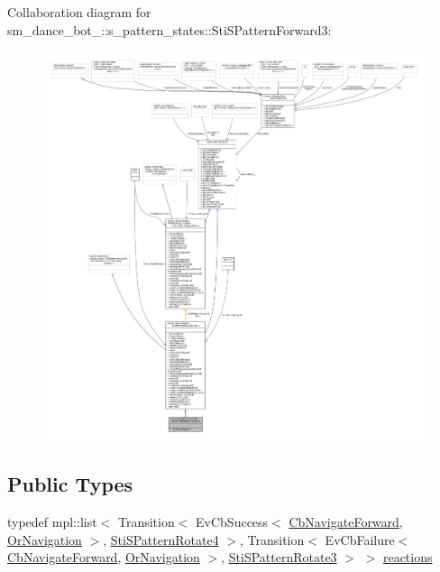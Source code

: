Collaboration diagram for sm\+\_\+dance\+\_\+bot\+\_\+:\+:s\+\_\+pattern\+\_\+states\+:\+:Sti\+S\+Pattern\+Forward3\+:
\nopagebreak
\begin{figure}[H]
\begin{center}
\leavevmode
\includegraphics[width=350pt]{structsm__dance__bot__2_1_1s__pattern__states_1_1StiSPatternForward3__coll__graph}
\end{center}
\end{figure}
\subsection*{Public Types}
\begin{DoxyCompactItemize}
\item 
typedef mpl\+::list$<$ Transition$<$ Ev\+Cb\+Success$<$ \hyperlink{classcl__move__base__z_1_1CbNavigateForward}{Cb\+Navigate\+Forward}, \hyperlink{classsm__dance__bot__2_1_1OrNavigation}{Or\+Navigation} $>$, \hyperlink{structsm__dance__bot__2_1_1s__pattern__states_1_1StiSPatternRotate4}{Sti\+S\+Pattern\+Rotate4} $>$, Transition$<$ Ev\+Cb\+Failure$<$ \hyperlink{classcl__move__base__z_1_1CbNavigateForward}{Cb\+Navigate\+Forward}, \hyperlink{classsm__dance__bot__2_1_1OrNavigation}{Or\+Navigation} $>$, \hyperlink{structsm__dance__bot__2_1_1s__pattern__states_1_1StiSPatternRotate3}{Sti\+S\+Pattern\+Rotate3} $>$ $>$ \hyperlink{structsm__dance__bot__2_1_1s__pattern__states_1_1StiSPatternForward3_a5928b0e9751fe1cb371aa33973e3bcda}{reactions}
\end{DoxyCompactItemize}
